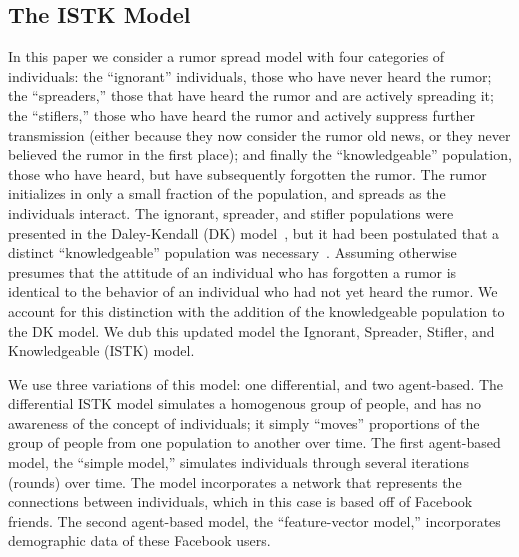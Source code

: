 \subsection{The ISTK Model}
\label{subsec:istk}

In this paper we consider a rumor spread model with four categories of individuals: the ``ignorant'' individuals, those who have never heard the rumor; the ``spreaders,'' those that have heard the rumor and are actively spreading it; the ``stiflers,'' those who have heard the rumor and actively suppress further transmission (either because they now consider the rumor old news, or they never believed the rumor in the first place); and finally the ``knowledgeable'' population, those who have heard, but have subsequently forgotten the rumor.
The rumor initializes in only a small fraction of the population, and spreads as the individuals interact.
The ignorant, spreader, and stifler populations were presented in the Daley-Kendall (DK) model~\cite{daley-1965}, but it had been postulated that a distinct ``knowledgeable'' population was necessary~\cite{zhao-2012, zhao-2011}.
Assuming otherwise presumes that the attitude of an individual who has forgotten a rumor is identical to the behavior of an individual who had not yet heard the rumor.
We account for this distinction with the addition of the knowledgeable population to the DK model.
We dub this updated model the Ignorant, Spreader, Stifler, and Knowledgeable (ISTK) model.

We use three variations of this model: one differential, and two agent-based.
The differential ISTK model simulates a homogenous group of people, and has no awareness of the concept of individuals; it simply ``moves'' proportions of the group of people from one population to another over time.
The first agent-based model, the ``simple model,'' simulates individuals through several iterations (rounds) over time.
The model incorporates a network that represents the connections between individuals, which in this case is based off of Facebook friends.
The second agent-based model, the ``feature-vector model,'' incorporates demographic data of these Facebook users.


